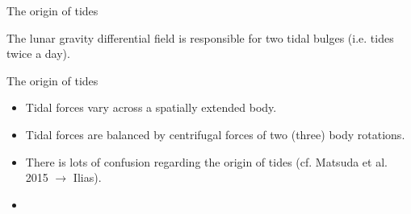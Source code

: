 \begin{frame}
  \begin{PointSix}{The origin of tides}
  \small The lunar gravity differential field is responsible for two tidal bulges (i.e. tides twice a day).
\end{PointSix}
\end{frame}

\begin{frame}
  \begin{PointSix}{The origin of tides}
      \small
      \begin{itemize}
        \item Tidal forces vary across a spatially extended body.
        \item Tidal forces are balanced by centrifugal forces of two (three) body rotations.
        \item There is lots of confusion regarding the origin of tides (cf. Matsuda et al. 2015 $\rightarrow$ Ilias).
        \item \color{MyBlue}{Tide models can be used for correction} 
      \end{itemize}
  \end{PointSix}
\end{frame}

